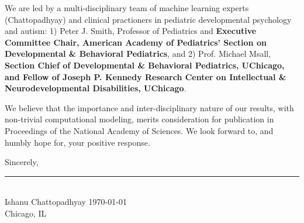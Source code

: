 \documentclass[9pt,onecolumn,compsoc]{IEEEtran}
\newcommand{\Space}{\vspace{10pt}}
\def\JNAME{Proceedings of the National Academy of Sciences\xspace}
\begin{document}
We are led by a multi-disciplinary team  of machine learning experts (Chattopadhyay) and clinical practioners in pediatric developmental psychology and autism: 1) Peter J. Smith, Professor of Pediatrics and \textbf{Executive Committee Chair, American Academy of Pediatrics' Section on Developmental \& Behavioral
Pediatrics}, and 2) Prof. Michael Msall, \textbf{Section Chief of Developmental \& Behavioral Pediatrics, UChicago, and Fellow of Joseph  P. Kennedy Research Center on Intellectual \& Neurodevelopmental Disabilities, UChicago}.

We believe that  the importance  and  inter-disciplinary nature of our results, with non-trivial computational modeling,  merits consideration  for  publication in \JNAME.  We look forward to, and humbly hope for, your positive  response.
\Space

Sincerely,
\vspace{-20pt}

% 
\begin{flushleft}
\vspace{-30pt}

\rule{2.5in}{1pt}\\
{\fontsize{10}{10}\selectfont Ishanu Chattopadhyay}
\hfill \today\\
Chicago, IL
\end{flushleft}

\end{document}
